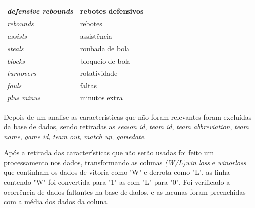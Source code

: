 \begin{table}[htbp]
\begin{longtable}{|l|l|}
		\textit{defensive rebounds}            & rebotes defensivos                                                                                                                                \\ \hline
		\textit{rebounds}                      & rebotes                                                                                                                                           \\ \hline
		\textit{assists}                       & assistência                                                                                                                                       \\ \hline
		\textit{steals}                        & roubada de bola                                                                                                                                   \\ \hline
		\textit{blocks}                        & bloqueio de bola                                                                                                                                  \\ \hline
		\textit{turnovers}                     & rotatividade                                                                                                                                      \\ \hline
		\textit{fouls}                         & faltas                                                                                                                                            \\ \hline
		\textit{plus minus}                    & minutos extra    \\ \hline                                                                       
	\end{longtable}
\end{table}

Depois de um analise as características que não foram relevantes foram excluídas da base de dados, sendo retiradas as \textit{season id}, \textit{team id}, \textit{team abbreviation}, \textit{team name}, \textit{game id}, \textit{team out}, \textit{match up}, \textit{gamedate}.
 


 


Após a retirada das características que não serão usadas foi feito um processamento nos dados, transformando as colunas \textit{(W/L)win loss} e \textit{winorloss} que continham os dados de vitoria como "W" e derrota como "L", as linha contendo "W" foi convertida para "1" as com "L" para "0". Foi verificado a ocorrência de dados faltantes na base de dados, e as lacunas foram preenchidas com a média dos dados da coluna.

